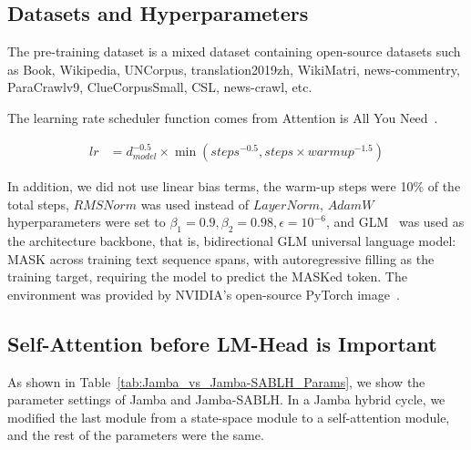 \documentclass{article}
\theoremstyle{plain}
\theoremstyle{definition}
\theoremstyle{remark}
\begin{document}
\subsection{Datasets and Hyperparameters}
The pre-training dataset is a mixed dataset containing open-source datasets such as Book, Wikipedia, UNCorpus, translation2019zh, WikiMatri, news-commentry, ParaCrawlv9, ClueCorpusSmall, CSL, news-crawl, etc.

The learning rate scheduler function comes from Attention is All You Need~\cite{wolf-etal-2020-transformers}.

\begin{equation}
\begin{aligned}
   lr &= d_{model}^{-0.5} \times \min(steps^{-0.5}, steps \times warmup^{-1.5})
\end{aligned}
\end{equation}

In addition, we did not use linear bias terms, the warm-up steps were 10\% of the total steps, $RMSNorm$ was used instead of $LayerNorm$, $AdamW$ hyperparameters were set to $\beta_1 = 0.9, \beta_2 = 0.98, \epsilon = 10^{-6}$, and GLM~\cite{du2022glm} was used as the architecture backbone, that is, bidirectional GLM universal language model: MASK across training text sequence spans, with autoregressive filling as the training target, requiring the model to predict the MASKed token. The environment was provided by NVIDIA's open-source PyTorch image~\cite{pytorch}.


\subsection{Self-Attention before LM-Head is Important}
\label{sec:Self-Attention_before_LM-Head_is_Important}

As shown in Table~\ref{tab:Jamba_vs_Jamba-SABLH_Params}, we show the parameter settings of Jamba and Jamba-SABLH. In a Jamba hybrid cycle, we modified the last module from a state-space module to a self-attention module, and the rest of the parameters were the same.
\end{document}
